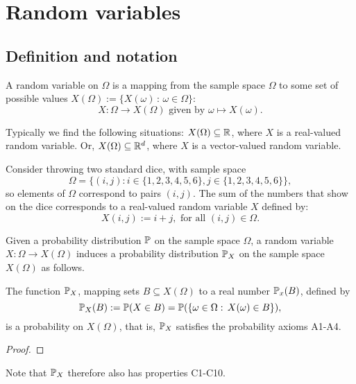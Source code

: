 \documentclass[10pt, a4paper]{article}
\begin{document}
\newpage

\section{Random variables}

\subsection{Definition and notation}

\begin{definition}
    A random variable on $\Omega$ is a mapping from the sample space $\Omega$ to some set of possible values
    $X(\Omega) := \{X(\omega) \,:\, \omega \in \Omega\}$:
    \[
    X : \Omega \rightarrow X(\Omega) \text{ given by } \omega \mapsto X(\omega).
    \]
\end{definition}
Typically we find the following situations:
$X(\Omega) \subseteq \R$,
where $X$ is a real-valued random variable.
Or, $X(\Omega) \subseteq \R ^ d$,
where $X$ is a vector-valued random variable.

\begin{example}
    Consider throwing two standard dice, with sample space
    \[
    \Omega = \{(i, j) : i \in \{1, 2, 3, 4, 5, 6\}, j \in \{1, 2, 3, 4, 5, 6\}\},
    \]
    so elements of $\Omega$ correspond to pairs $(i, j)$.
    The sum of the numbers that show on the dice corresponds to a real-valued random variable $X$ defined by:
    \[
    X(i, j) := i + j,\text{ for all } (i, j) \in \Omega.
    \]
\end{example}

Given a probability distribution $\P$ on the sample space $\Omega$,
a random variable
$X : \Omega \rightarrow X(\Omega)$ induces a probability distribution $\P_X$ on the sample space $X(\Omega)$ as follows.

\begin{theorem}
    The function $\P_X$,
    mapping sets $B \subseteq X(\Omega)$ to a real number $\P_x(B)$,
    defined by
    \[
    \P_X(B) := \P(X \in B) = \P(\{\omega \in \Omega:\, X(\omega) \in B\}),
    \]
    is a probability on $X(\Omega)$,
    that is,
    $\P_X$ satisfies the probability axioms A1-A4.
    \begin{proof}
        
    \end{proof}
\end{theorem}
Note that $\P_X$ therefore also has properties C1-C10.
\end{document}
